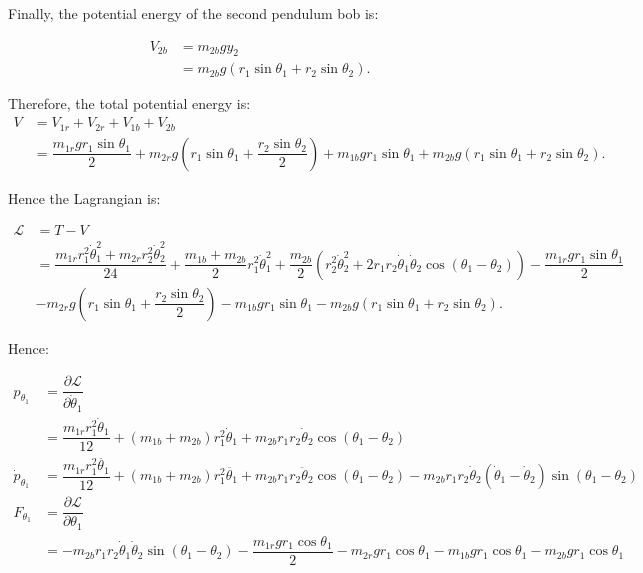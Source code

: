 \documentclass[12pt,a4paper,landscape]{article}
\begin{document}
	Finally, the potential energy of the second pendulum bob is:
	
	\begin{align*}
		V_{2b} &= m_{2b} gy_2 \\
		&= m_{2b} g \left(r_1 \sin{\theta_1} + r_2 \sin{\theta_2}\right).
	\end{align*}
	
	Therefore, the total potential energy is:
	\begin{align*}
		V &= V_{1r} + V_{2r} + V_{1b} + V_{2b} \\
		&= \dfrac{m_{1r}gr_1 \sin{\theta_1}}{2} + m_{2r}g \left(r_1 \sin{\theta_1} + \dfrac{r_2\sin{\theta_2}}{2}\right) + m_{1b}gr_1 \sin{\theta_1} + m_{2b} g \left(r_1 \sin{\theta_1} + r_2 \sin{\theta_2}\right).
	\end{align*}
	
	Hence the Lagrangian is:
	
	\begin{align*}
		\mathcal{L} &= T - V \\
		&= \dfrac{m_{1r} r_1^2 \dot{\theta}_1^2 + m_{2r}r_2^2 \dot{\theta}_2^2}{24} + \dfrac{m_{1b}+m_{2b}}{2}r_1^2 \dot{\theta}_1^2 + \dfrac{m_{2b}}{2} \left(r_2^2\dot{\theta}_2^2 + 2r_1 r_2 \dot{\theta}_1 \dot{\theta}_2 \cos{\left(\theta_1 - \theta_2\right)}\right) - \dfrac{m_{1r}gr_1 \sin{\theta_1}}{2} \\
		&-m_{2r}g \left(r_1 \sin{\theta_1} + \dfrac{r_2\sin{\theta_2}}{2}\right) - m_{1b}gr_1 \sin{\theta_1} - m_{2b} g \left(r_1 \sin{\theta_1} + r_2 \sin{\theta_2}\right).
	\end{align*}
	
	Hence:
	
	\begin{align*}
		p_{\theta_1} &= \dfrac{\partial \mathcal{L}}{\partial \dot{\theta}_1} \\
		&= \dfrac{m_{1r}r_1^2\dot{\theta}_1}{12}+(m_{1b}+m_{2b})r_1^2 \dot{\theta}_1 + m_{2b}r_1 r_2 \dot{\theta}_2\cos{(\theta_1-\theta_2)} \\
		\dot{p}_{\theta_1} &= \dfrac{m_{1r}r_1^2 \ddot{\theta_1}}{12} + (m_{1b}+m_{2b})r_1^2 \ddot{\theta_1} + m_{2b} r_1r_2 \ddot{\theta}_2 \cos{(\theta_1-\theta_2)} - m_{2b} r_1r_2 \dot{\theta}_2(\dot{\theta}_1-\dot{\theta}_2)\sin{(\theta_1-\theta_2)} \\
		F_{\theta_1} &= \dfrac{\partial \mathcal{L}}{\partial \theta_1} \\
		&= -m_{2b}r_1r_2 \dot{\theta}_1 \dot{\theta}_2 \sin{(\theta_1-\theta_2)}-\dfrac{m_{1r}gr_1\cos{\theta_1}}{2} -m_{2r}gr_1\cos{\theta_1}-m_{1b}gr_1\cos{\theta_1}-m_{2b}gr_1\cos{\theta_1} \\
	\end{align*}
	
\end{document}
